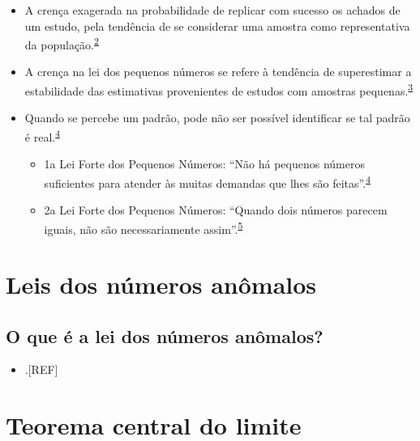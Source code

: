 \documentclass[
  a4paper,
]{book}
\providecommand{\tightlist}{%
  \setlength{\itemsep}{0pt}\setlength{\parskip}{0pt}}
\begin{document}
\begin{itemize}
\item
  A crença exagerada na probabilidade de replicar com sucesso os achados de um estudo, pela tendência de se considerar uma amostra como representativa da população.\textsuperscript{\protect\hyperlink{ref-tversky1971}{2}}
\item
  A crença na lei dos pequenos números se refere à tendência de superestimar a estabilidade das estimativas provenientes de estudos com amostras pequenas.\textsuperscript{\protect\hyperlink{ref-bishop2022}{3}}
\item
  Quando se percebe um padrão, pode não ser possível identificar se tal padrão é real.\textsuperscript{\protect\hyperlink{ref-guy1988}{4}}

  \begin{itemize}
  \item
    1a Lei Forte dos Pequenos Números: ``Não há pequenos números suficientes para atender às muitas demandas que lhes são feitas''.\textsuperscript{\protect\hyperlink{ref-guy1988}{4}}
  \item
    2a Lei Forte dos Pequenos Números: ``Quando dois números parecem iguais, não são necessariamente assim''.\textsuperscript{\protect\hyperlink{ref-guy1990}{5}}
  \end{itemize}
\end{itemize}

\hypertarget{lei-numeros-anomals}{%
\section{Leis dos números anômalos}\label{lei-numeros-anomals}}

\hypertarget{o-que-uxe9-a-lei-dos-nuxfameros-anuxf4malos}{%
\subsection{O que é a lei dos números anômalos?}\label{o-que-uxe9-a-lei-dos-nuxfameros-anuxf4malos}}

\begin{itemize}
\tightlist
\item
  .{[}REF{]}
\end{itemize}

\hypertarget{teorema-central-limite}{%
\section{Teorema central do limite}\label{teorema-central-limite}}
\end{document}

